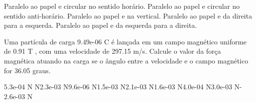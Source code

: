 \documentclass[12pt, addpoints]{exam}
\begin{document}
\begin{questions}
\begin{multicols*}{2}
\begin{choices}
\choice Paralelo ao papel e circular no sentido horário. 
\choice Paralelo ao papel e circular no sentido anti-horário. 
\choice Paralelo ao papel e na vertical. 
\choice Paralelo ao papel e da direita para a esquerda. 
\choice Paralelo ao papel e da esquerda para a direita. 
\end{choices}
\question Uma partícula de carga 9.49e-06 C é lançada em um campo magnético uniforme de    0.91 T , com uma velocidade de 297.15 m/s. Calcule o valor da força magnética atuando na carga se o ângulo entre a velocidade e o campo magnético for   36.05 graus.

\begin{oneparchoices}
\choice 5.3e-04 N N\choice 2.3e-03 N\choice 9.6e-06 N\choice 1.5e-03 N\choice 2.1e-03 N\choice 1.6e-03 N\choice 4.0e-04 N\choice 3.0e-03 N\choice -2.6e-03 N
\end{oneparchoices}\end{multicols*}
\end{questions}
\newpage
\end{document}
